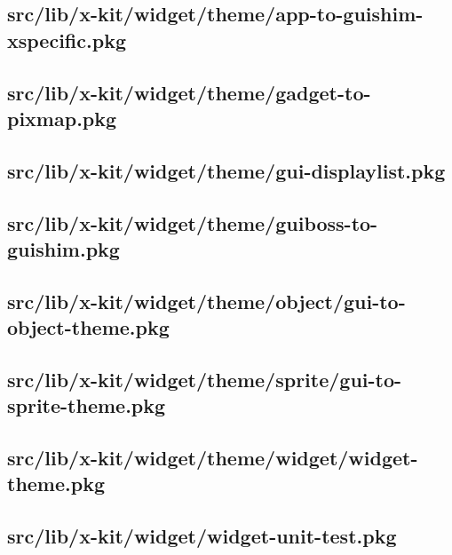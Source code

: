 \subsection{src/lib/x-kit/widget/theme/app-to-guishim-xspecific.pkg}


\subsection{src/lib/x-kit/widget/theme/gadget-to-pixmap.pkg}


\subsection{src/lib/x-kit/widget/theme/gui-displaylist.pkg}


\subsection{src/lib/x-kit/widget/theme/guiboss-to-guishim.pkg}


\subsection{src/lib/x-kit/widget/theme/object/gui-to-object-theme.pkg}


\subsection{src/lib/x-kit/widget/theme/sprite/gui-to-sprite-theme.pkg}


\subsection{src/lib/x-kit/widget/theme/widget/widget-theme.pkg}


\subsection{src/lib/x-kit/widget/widget-unit-test.pkg}


